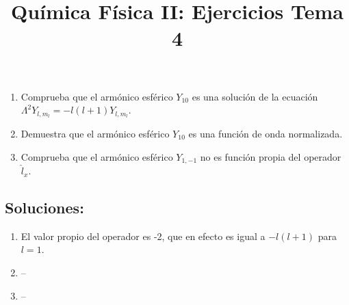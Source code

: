 \documentclass{tufte-handout}
\title[Química Física II: Ejercicios Tema 4]{
Química Física II: Ejercicios Tema 4}
\date{}  %
\begin{document}
\maketitle
\large 

\begin{enumerate}
 \item Comprueba que el armónico esférico $Y_{10}$ es una solución 
  de la ecuación $\Lambda^2Y_{l,m_l}=-l(l+1)Y_{l,m_l}$.
\item Demuestra que el armónico esférico $Y_{10}$ es una función de onda normalizada.
  
\item Comprueba que el armónico esférico $Y_{1,-1}$ no es función propia del operador $\hat{l}_x$.
\end{enumerate}

\newpage
\subsection{\textbf{Soluciones:}}
\begin{enumerate}
    \item El valor propio del operador es -2, que en
  efecto es igual a $-l(l+1)$ para $l=1$.
  \item --
  \item --
\end{enumerate}
\end{document}
